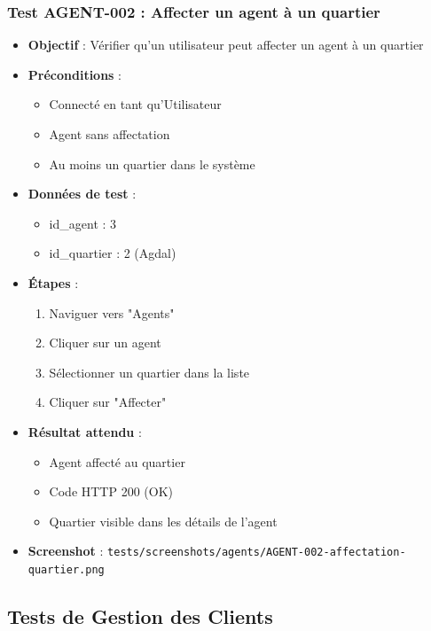 \subsubsection{Test AGENT-002 : Affecter un agent à un quartier}
\begin{itemize}
    \item \textbf{Objectif} : Vérifier qu'un utilisateur peut affecter un agent à un quartier
    \item \textbf{Préconditions} : 
        \begin{itemize}
            \item Connecté en tant qu'Utilisateur
            \item Agent sans affectation
            \item Au moins un quartier dans le système
        \end{itemize}
    \item \textbf{Données de test} :
        \begin{itemize}
            \item id\_agent : 3
            \item id\_quartier : 2 (Agdal)
        \end{itemize}
    \item \textbf{Étapes} :
        \begin{enumerate}
            \item Naviguer vers "Agents"
            \item Cliquer sur un agent
            \item Sélectionner un quartier dans la liste
            \item Cliquer sur "Affecter"
        \end{enumerate}
    \item \textbf{Résultat attendu} : 
        \begin{itemize}
            \item Agent affecté au quartier
            \item Code HTTP 200 (OK)
            \item Quartier visible dans les détails de l'agent
        \end{itemize}
    \item \textbf{Screenshot} : \texttt{tests/screenshots/agents/AGENT-002-affectation-quartier.png}
\end{itemize}

\subsection{Tests de Gestion des Clients}

